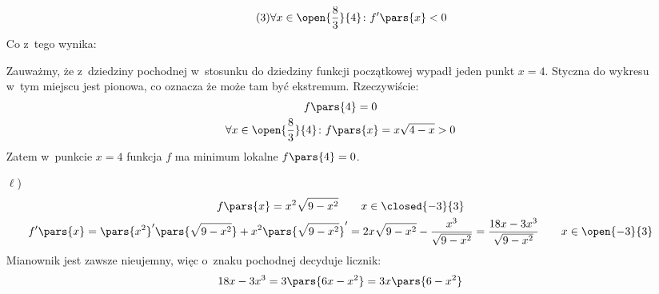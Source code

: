 \begin{itemize}
\begin{gather*}
            \tag{\(3\)} \forall x \in \open{\frac{8}{3}}{4}\colon f'\pars{x} < 0 \label{2020_10_21:7_3:k:decrease}
        \end{gather*}
        Co z~tego wynika:
        Zauważmy, że z~dziedziny pochodnej w~stosunku do dziedziny funkcji początkowej wypadł jeden punkt \(x = 4\). Styczna do wykresu w~tym miejscu jest pionowa, co oznacza że może tam być ekstremum. Rzeczywiście:
        \begin{gather*}
            f\pars{4} = 0\\
            \forall x \in \open{\frac{8}{3}}{4}\colon f\pars{x} = x\sqrt{4 - x} > 0
        \end{gather*}
        Zatem w~punkcie \(x = 4\) funkcja \(f\) ma minimum lokalne \(f\pars{4} = 0\).
    \item[\(\ell\))]
        \begin{gather*}
            f\pars{x} = x^2\sqrt{9 - x^2} \qquad x \in \closed{-3}{3}\\
            f'\pars{x} = \pars{x^2}'\pars{\sqrt{9 - x^2}} + x^2\pars{\sqrt{9 - x^2}}'
                = 2x\sqrt{9 - x^2} - \frac{x^3}{\sqrt{9 - x^2}}
                = \frac{18x - 3x^3}{\sqrt{9 - x^2}} \qquad x \in \open{-3}{3}
        \end{gather*}
        Mianownik jest zawsze nieujemny, więc o~znaku pochodnej decyduje licznik:
        \begin{gather*}
            18x - 3x^3 = 3\pars{6x - x^2} = 3x\pars{6 - x^2}\\

\end{gather*}
\end{itemize}
